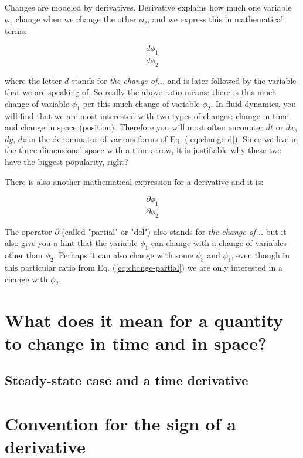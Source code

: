 Changes are modeled by derivatives. Derivative explains how much one variable $\phi_1$ change when we change the other $\phi_2$, and we express this in mathematical terms:

\begin{equation}\label{eq:change-d}
\frac{d \phi_1}{d \phi_2}
\end{equation}

where the letter $d$ stands for \textit{the change of...} and is later followed by the variable that we are speaking of. So really the above ratio means: there is this much change of variable $\phi_1$ per this much change of variable $\phi_2$. In fluid dynamics, you will find that we are most interested with two types of changes: change in time and change in space (position). Therefore you will most often encounter $dt$ or $dx$, $dy$, $dz$ in the denominator of various forms of Eq. (\ref{eq:change-d}). Since we live in the three-dimensional space with a time arrow, it is justifiable why these two have the biggest popularity, right?

There is also another mathematical expression for a derivative and it is:

\begin{equation}\label{eq:change-partial}
\frac{\partial \phi_1}{\partial \phi_2}
\end{equation}

The operator $\partial$ (called "partial" or "del") also stands for \textit{the change of...} but it also give you a hint that the variable $\phi_1$ can change with a change of variables other than $\phi_2$. Perhaps it can also change with some $\phi_3$ and $\phi_4$, even though in this particular ratio from Eq. (\ref{eq:change-partial}) we are only interested in a change with $\phi_2$.

\section{What does it mean for a quantity to change in time and in space?}


\subsection{Steady-state case and a time derivative}

\section{Convention for the sign of a derivative}

